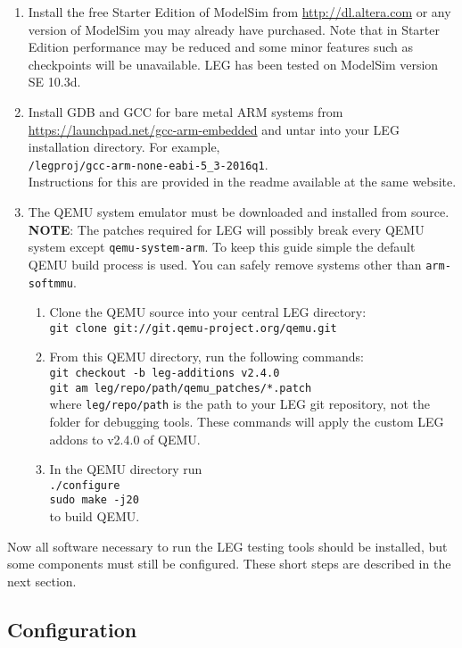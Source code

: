 \begin{enumerate}
\item Install the free Starter Edition of ModelSim from \url{http://dl.altera.com} or any version of ModelSim you may already have purchased. 
Note that in Starter Edition performance may be reduced and some minor features such as checkpoints will be unavailable. 
LEG has been tested on ModelSim version SE 10.3d. 

\item Install GDB and GCC for bare metal ARM systems from \url{https://launchpad.net/gcc-arm-embedded} and untar into your LEG installation directory. 
For example, \\\texttt{/legproj/gcc-arm-none-eabi-5\_3-2016q1}.\\
Instructions for this are provided in the readme available at the same website.

\item The QEMU system emulator must be downloaded and installed from source. 
\textbf{NOTE}: The patches required for LEG will possibly break every QEMU system except \texttt{qemu-system-arm}. 
To keep this guide simple the default QEMU build process is used. 
You can safely remove systems other than \texttt{arm-softmmu}.
	\begin{enumerate}
	\item Clone the QEMU source into your central LEG directory: \\\texttt{git clone git://git.qemu-project.org/qemu.git}
	\item From this QEMU directory, run the following commands: \\\texttt{git checkout -b leg-additions v2.4.0 \\ git am leg/repo/path/qemu\_patches/*.patch}\\
	where \texttt{leg/repo/path} is the path to your LEG git repository, not the folder for debugging tools.
	These commands will apply the custom LEG addons to v2.4.0 of QEMU.
	\item In the QEMU directory run \\\texttt{./configure \\ sudo make -j20}\\ to build QEMU.
	\end{enumerate}
\end{enumerate}

Now all software necessary to run the LEG testing tools should be installed, but some components must still be configured.
These short steps are described in the next section.

\subsection{Configuration}

